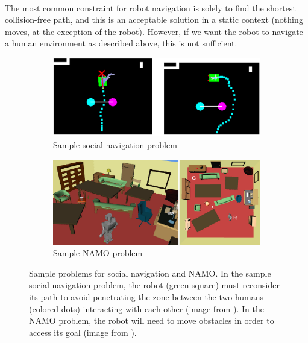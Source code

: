 \paragraph{} The most common constraint for robot navigation is solely to find the shortest collision-free path, and this is an acceptable solution in a static context (nothing moves, at the exception of the robot). However, if we want the robot to navigate a human environment as described above, this is not sufficient.

\begin{figure}[H]
\centering
\begin{subfigure}{.5\textwidth}
  \centering
  \includegraphics[width=0.9\linewidth]{Figures/Problem_Illustration/social_problem.png}
  \caption{Sample social navigation problem}
  \label{fig:social_problem}
\end{subfigure}%
\begin{subfigure}{.5\textwidth}
  \centering
  \includegraphics[width=0.9\linewidth]{Figures/Problem_Illustration/namo_problem.png}
  \caption{Sample NAMO problem}
  \label{fig:namo_problem}
\end{subfigure}
\caption{Sample problems for social navigation and NAMO. In the sample social navigation problem, the robot (green square) must reconsider its path to avoid penetrating the zone between the two humans (colored dots) interacting with each other (image from \parencite{rios-martinez_understanding_2011}). In the NAMO problem,  the robot will need to move obstacles in order to access its goal (image from \parencite{stilman_navigation_2005}).}
\label{fig:navigation_problems}
\end{figure}

